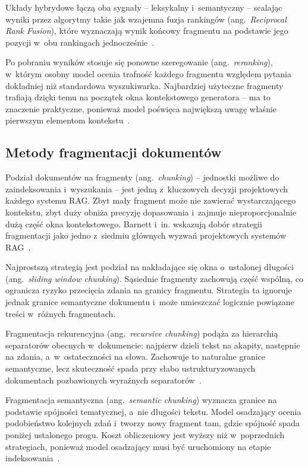 Układy hybrydowe łączą oba sygnały -- leksykalny i~semantyczny -- scalając
wyniki przez algorytmy takie jak wzajemna fuzja rankingów
(ang.~\textit{Reciprocal Rank Fusion}), które wyznaczają wynik końcowy
fragmentu na podstawie jego pozycji w~obu rankingach
jednocześnie~\cite{cormack2009reciprocal}.

Po pobraniu wyników stosuje się ponowne szeregowanie (ang.~\textit{reranking}),
w~którym osobny model ocenia trafność każdego fragmentu względem pytania
dokładniej niż standardowa wyszukiwarka. Najbardziej użyteczne fragmenty
trafiają dzięki temu na początek okna kontekstowego generatora -- ma to
znaczenie praktyczne, ponieważ model poświęca największą uwagę właśnie
pierwszym elementom kontekstu~\cite{pradeep2023rankvicuna}.

\subsection{Metody fragmentacji dokumentów}\label{subsec:metody-fragmentacji-dokumentow}

Podział dokumentów na fragmenty (ang.~\textit{chunking}) -- jednostki możliwe
do zaindeksowania i~wyszukania -- jest jedną z~kluczowych decyzji projektowych
każdego systemu RAG. Zbyt mały fragment może nie zawierać wystarczającego
kontekstu, zbyt duży obniża precyzję dopasowania i~zajmuje nieproporcjonalnie
dużą część okna kontekstowego. Barnett i~in. wskazują dobór strategii
fragmentacji jako jedno z~siedmiu głównych wyzwań projektowych systemów
RAG~\cite{barnett2024seven}.

Najprostszą strategią jest podział na nakładające się okna o~ustalonej długości
(ang.~\textit{sliding window chunking}). Sąsiednie fragmenty zachowują część
wspólną, co ogranicza ryzyko przecięcia zdania na granicy fragmentu. Strategia
ta ignoruje jednak granice semantyczne dokumentu i~może umieszczać logicznie
powiązane treści w~różnych fragmentach.

Fragmentacja rekurencyjna (ang.~\textit{recursive chunking}) podąża za
hierarchią separatorów obecnych w~dokumencie: najpierw dzieli tekst na akapity,
następnie na zdania, a~w~ostateczności na słowa. Zachowuje to naturalne granice
semantyczne, lecz skuteczność spada przy słabo ustrukturyzowanych dokumentach
pozbawionych wyraźnych separatorów~\cite{barnett2024seven}.

Fragmentacja semantyczna (ang.~\textit{semantic chunking}) wyznacza granice na
podstawie spójności tematycznej, a~nie długości tekstu. Model osadzający ocenia
podobieństwo kolejnych zdań i~tworzy nowy fragment tam, gdzie spójność spada
poniżej ustalonego progu. Koszt obliczeniowy jest wyższy niż w~poprzednich
strategiach, ponieważ model osadzający musi być uruchomiony na etapie
indeksowania~\cite{barnett2024seven}.

